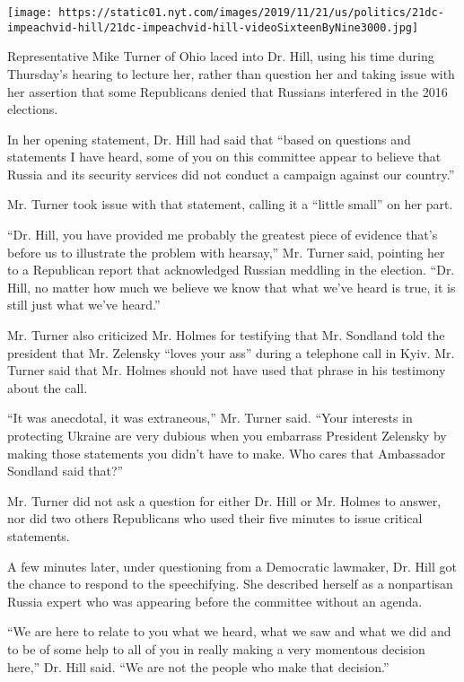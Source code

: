 \texttt{[image: https://static01.nyt.com/images/2019/11/21/us/politics/21dc-impeachvid-hill/21dc-impeachvid-hill-videoSixteenByNine3000.jpg]}

Representative Mike Turner of Ohio laced into Dr. Hill, using his time
during Thursday's hearing to lecture her, rather than question her and
taking issue with her assertion that some Republicans denied that
Russians interfered in the 2016 elections.

In her opening statement, Dr. Hill had said that ``based on questions
and statements I have heard, some of you on this committee appear to
believe that Russia and its security services did not conduct a campaign
against our country.''

Mr. Turner took issue with that statement, calling it a ``little small''
on her part.

``Dr. Hill, you have provided me probably the greatest piece of evidence
that's before us to illustrate the problem with hearsay,'' Mr. Turner
said, pointing her to a Republican report that acknowledged Russian
meddling in the election. ``Dr. Hill, no matter how much we believe we
know that what we've heard is true, it is still just what we've heard.''

Mr. Turner also criticized Mr. Holmes for testifying that Mr. Sondland
told the president that Mr. Zelensky ``loves your ass'' during a
telephone call in Kyiv. Mr. Turner said that Mr. Holmes should not have
used that phrase in his testimony about the call.

``It was anecdotal, it was extraneous,'' Mr. Turner said. ``Your
interests in protecting Ukraine are very dubious when you embarrass
President Zelensky by making those statements you didn't have to make.
Who cares that Ambassador Sondland said that?''

Mr. Turner did not ask a question for either Dr. Hill or Mr. Holmes to
answer, nor did two others Republicans who used their five minutes to
issue critical statements.

A few minutes later, under questioning from a Democratic lawmaker, Dr.
Hill got the chance to respond to the speechifying. She described
herself as a nonpartisan Russia expert who was appearing before the
committee without an agenda.

``We are here to relate to you what we heard, what we saw and what we
did and to be of some help to all of you in really making a very
momentous decision here,'' Dr. Hill said. ``We are not the people who
make that decision.''

